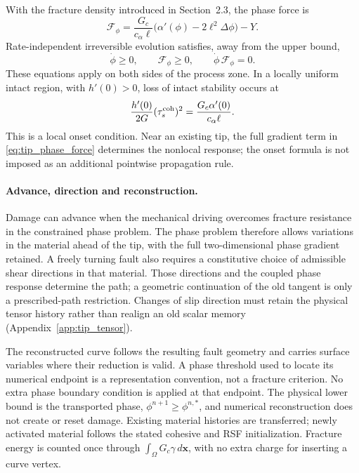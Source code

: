 \documentclass[10pt,a4paper]{article}
\begin{document}
With the fracture density introduced in Section~2.3, the phase force is
\begin{equation}
 \mathcal F_\phi
 =\frac{G_c}{c_\alpha\ell}
      \bigl(\alpha'(\phi)-2\ell^2\Delta\phi\bigr)-Y.
 \label{eq:tip_phase_force}
\end{equation}
Rate-independent irreversible evolution satisfies, away from the upper bound,
\begin{equation}
 \dot\phi\geq0,\qquad \mathcal F_\phi\geq0,
 \qquad \dot\phi\,\mathcal F_\phi=0.
 \label{eq:tip_phase_law}
\end{equation}
These equations apply on both sides of the process zone. In a locally uniform
intact region, with $h'(0)>0$, loss of intact stability occurs at
\begin{equation}
 \frac{h'(0)}{2G}(\tau_s^{\rm coh})^2
       =\frac{G_c\alpha'(0)}{c_\alpha\ell}.
 \label{eq:tip_onset}
\end{equation}
This is a local onset condition. Near an existing tip, the full gradient term
in \eqref{eq:tip_phase_force} determines the nonlocal response; the onset
formula is not imposed as an additional pointwise propagation rule.

\paragraph{Advance, direction and reconstruction.}
Damage can advance when the mechanical driving overcomes fracture resistance
in the constrained phase problem. The phase problem therefore
allows variations in the material ahead of the tip, with the full two-dimensional
phase gradient retained. A freely turning fault also requires a constitutive
choice of admissible shear directions in that material. Those directions and
the coupled phase response determine the path; a geometric continuation of the
old tangent is only a prescribed-path restriction. Changes of slip direction
must retain the physical tensor history rather than realign an old scalar
memory (Appendix~\ref{app:tip_tensor}).

The reconstructed curve follows the resulting fault geometry and carries
surface variables where their reduction is valid. A phase threshold used to
locate its numerical endpoint is a representation convention, not a fracture
criterion. No extra phase boundary condition is applied at that endpoint.
The physical lower bound is the transported phase,
$\phi^{n+1}\geq\phi^{n,*}$, and numerical reconstruction does not create or
reset damage. Existing material histories are transferred; newly activated
material follows the stated cohesive and RSF initialization. Fracture energy
is counted once through $\int_\Omega G_c\gamma\,d\bm x$, with no extra
charge for inserting a curve vertex.
\end{document}
